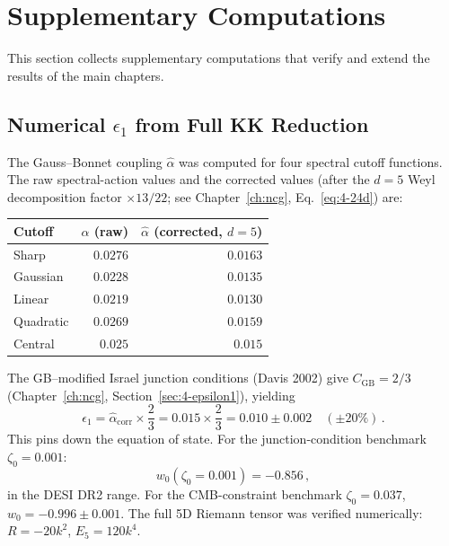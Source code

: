 \section{Supplementary Computations}
\label{app:completeness}

This section collects supplementary computations that verify and extend the results of the main chapters.

\subsection{Numerical $\epsilon_1$ from Full KK Reduction}
\label{app:c1-gb-kk}

The Gauss--Bonnet coupling $\hat{\alpha}$ was computed for four spectral cutoff functions. The raw spectral-action values and the corrected values (after the $d = 5$ Weyl decomposition factor $\times 13/22$; see Chapter~\ref{ch:ncg}, Eq.~\eqref{eq:4-24d}) are:
\begin{center}
\begin{tabular}{l r r}
\hline
Cutoff & $\hat{\alpha}$ (raw) & $\hat{\alpha}$ (corrected, $d{=}5$) \\
\hline
Sharp  & $0.0276$ & $0.0163$ \\
Gaussian & $0.0228$ & $0.0135$ \\
Linear & $0.0219$ & $0.0130$ \\
Quadratic & $0.0269$ & $0.0159$ \\
\hline
Central & $\mathbf{0.025}$ & $\mathbf{0.015}$ \\
\hline
\end{tabular}
\end{center}

\noindent
The GB--modified Israel junction conditions (Davis 2002) give $C_{\mathrm{GB}} = 2/3$ (Chapter~\ref{ch:ncg}, Section~\ref{sec:4-epsilon1}), yielding
\begin{equation}
  \epsilon_1 = \hat{\alpha}_{\mathrm{corr}} \times \frac{2}{3} = 0.015 \times \frac{2}{3} = 0.010 \pm 0.002
  \quad (\pm 20\%)\,.
\end{equation}
This pins down the equation of state. For the junction-condition benchmark $\zeta_0 = 0.001$:
\begin{equation}
  \boxed{w_0(\zeta_0{=}0.001) = -0.856}\,,
\end{equation}
in the DESI DR2 range. For the CMB-constraint benchmark $\zeta_0 = 0.037$, $w_0 = -0.996 \pm 0.001$. The full 5D Riemann tensor was verified numerically: $R = -20k^2$, $E_5 = 120k^4$.


